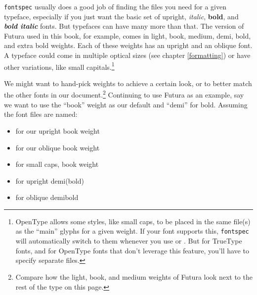 \texttt{fontspec} usually does a good job of finding
the files you need for a given typeface,
especially if you just want the basic set of
upright,
\textit{italic},
\textbf{bold}, and
\textit{\textbf{bold italic}} fonts.
But typefaces can have many more than that.
The version of Futura used in this book, for example, comes in
{light},
{book},
{medium},
{demi},
{bold}, and
{extra bold} weights.
Each of these weights has an upright and an oblique font.
A typeface could come in multiple optical sizes (see chapter \ref{formatting})
or have other variations, like
{small capitals}.\punckern\footnote{%
OpenType allows some styles, like small caps, to be placed in the same file(s)
as the ``main'' glyphs for a given weight.
If your font supports this, \texttt{fontspec}
will automatically switch to them whenever you use
 or .
But for TrueType fonts,
and for OpenType fonts that don't leverage this feature,
you'll have to specify separate files.}

We might want to hand-pick weights to achieve a certain look,
or to better match the
other fonts in our document.\punckern\footnote{Compare how
{the light,}
{book,}
{and medium weights}
of Futura look next to the rest of the type on this page.}
Continuing to use Futura as an example,
say we want to use the ``book'' weight as our default
and ``demi'' for bold.
Assuming the font files are named:
\begin{itemize}
\item {} for our
    {upright book weight}
\item {} for our
    {oblique book weight}
\item {} for
    {small caps, book weight}
\item {} for
    {upright demi(bold)}
\item {} for
    {oblique demibold}
\end{itemize}

